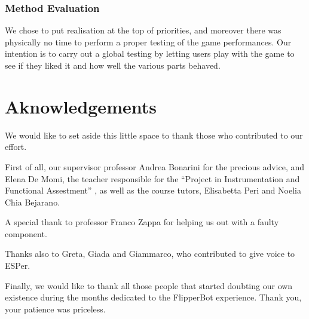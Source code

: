 \documentclass[a4paper,twoside]{book}
\begin{document}
\subsection*{Method Evaluation}

We chose to put realisation at the top of priorities, and moreover there was physically no time to perform a proper testing of the game performances. Our intention is to carry out a global testing by letting users play with the game to see if they liked it and how well the various parts behaved.


\chapter{Aknowledgements}

We would like to set aside this little space to thank those who contributed to our effort.

First of all, our supervisor professor Andrea Bonarini for the precious advice, and Elena De Momi, the teacher responsible for the \textquotedblleft{}Project in Instrumentation and Functional Assestment\textquotedblright{} , as well as the course tutors, Elisabetta Peri and Noelia Chia Bejarano.


A special thank to professor Franco Zappa for helping us out with a faulty component.

Thanks also to Greta, Giada and Giammarco, who contributed to give voice to ESPer.

Finally, we would like to thank all those people that started doubting our own existence during the months dedicated to the FlipperBot experience. Thank you, your patience was priceless.
\end{document}
